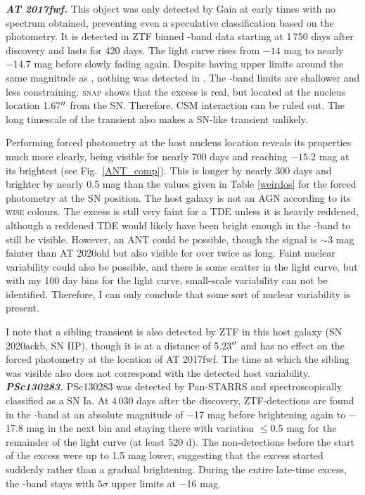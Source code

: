 \documentclass[a4paper,oneside,12pt, class=Latex/Classes/PhDthesisPSnPDF, crop=false]{standalone}
\begin{document}
\textit{\textbf{AT 2017fwf.}}
This object was only detected by Gaia at early times with no spectrum obtained, preventing even a speculative classification based on the photometry. It is detected in ZTF binned \ztfr-band data starting at 1\,750 days after discovery and lasts for 420 days. The light curve rises from $-14$ mag to nearly $-14.7$ mag before slowly fading again. Despite having upper limits around the same magnitude as \ztfr, nothing was detected in \ztfg. The \ztfi-band limits are shallower and less constraining. \textsc{snap} shows that the excess is real, but located at the nucleus location 1.67$^{\prime\prime}$ from the SN. Therefore, CSM interaction can be ruled out. The long timescale of the transient also makes a SN-like transient unlikely.

Performing forced photometry at the host nucleus location reveals its properties much more clearly, being visible for nearly 700 days and reaching $-15.2$ mag at its brightest (see Fig.~\ref{ANT_comp}). This is longer by nearly 300 days and brighter by nearly 0.5 mag than the values given in Table \ref{weirdos} for the forced photometry at the SN position. The host galaxy is not an AGN according to its \textsc{wise} colours. The excess is still very faint for a TDE unless it is heavily reddened, although a reddened TDE would likely have been bright enough in the \ztfi-band to still be visible. However, an ANT could be possible, though the signal is $\sim3$ mag fainter than AT 2020ohl but also visible for over twice as long. Faint nuclear variability could also be possible, and there is some scatter in the light curve, but with my 100 day bins for the light curve, small-scale variability can not be identified. Therefore, I can only conclude that some sort of nuclear variability is present.

I note that a sibling transient is also detected by ZTF in this host galaxy (SN 2020ackb, SN IIP), though it is at a distance of 5.23$^{\prime\prime}$ and has no effect on the forced photometry at the location of AT 2017fwf. The time at which the sibling was visible also does not correspond with the detected host variability.\\


\textit{\textbf{PSc130283.}}
PSc130283 was detected by Pan-STARRS and spectroscopically classified as a SN Ia. At 4\,030 days after the discovery, ZTF-detections are found in the \ztfr-band at an absolute magnitude of $-$17 mag before brightening again to $-$17.8 mag in the next bin and staying there with variation $\leq 0.5$ mag for the remainder of the light curve (at least 520 d). The non-detections before the start of the excess were up to 1.5 mag lower, suggesting that the excess started suddenly rather than a gradual brightening. During the entire late-time excess, the \ztfg-band stays with $5\sigma$ upper limits at $-$16 mag.
\end{document}
